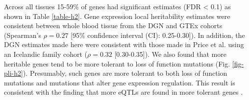 \documentclass[10pt,letterpaper]{article}
\begin{document}
Across all tissues 15-59\% of genes had significant estimates (FDR \textless{} 0.1)  as shown in Table \ref{table-h2}. Gene expression local heritability estimates were consistent between whole blood tissue from the DGN and GTEx cohorts (Spearman's $\rho = 0.27$ [95\% confidence interval (CI): 0.25-0.30]). In addition, the DGN estimates made here were  consistent with those made in Price et al. \cite{Price_2011} using an Icelandic family cohort ($\rho = 0.32$ [0.30-0.35]). We also found that more heritable genes tend to be more tolerant to loss of function mutations (Fig. \ref{fig-pli-h2}). Presumably, such genes are more tolerant to both loss of function mutations and mutations that alter gene expression regulation. This result is consistent with the finding that more eQTLs are found in more tolerant genes \cite{lek2016analysis}.
\end{document}
